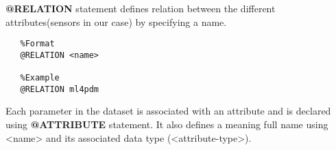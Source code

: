 \textbf{@RELATION} statement defines relation between the different attributes(sensors in our case) by specifying a name.
\begin{verbatim}
   %Format
   @RELATION <name>
   
   %Example
   @RELATION ml4pdm
\end{verbatim}
Each parameter in the dataset is associated with an attribute and is declared using \textbf{@ATTRIBUTE} statement. It also defines a meaning full name using <name> and its associated data type (<attribute-type>).



